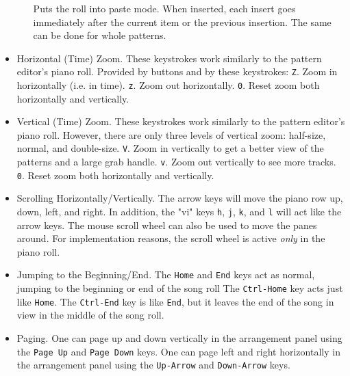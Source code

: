 \begin{itemize}
\begin{itemize}
            Puts the roll into paste mode.
            When inserted, each insert goes immediately
            after the current item or the previous insertion.  The same can be
            done for whole patterns.
         \end{itemize}
      \item Horizontal (Time) Zoom.  These keystrokes work similarly to the
      pattern editor's piano roll.
         Provided by buttons and by these keystrokes:
         \texttt{Z}. Zoom in horizontally (i.e. in time).
         \texttt{z}. Zoom out horizontally.
         \texttt{0}. Reset zoom both horizontally and vertically.
      \item Vertical (Time) Zoom.  These keystrokes work similarly to the
         pattern editor's piano roll.
         However, there are only three levels of
         vertical zoom:  half-size, normal, and double-size.
         \texttt{V}. Zoom in vertically to get a better view of the patterns
            and a large grab handle.
         \texttt{v}. Zoom out vertically to see more tracks.
         \texttt{0}. Reset zoom both horizontally and vertically.
      \item Scrolling Horizontally/Vertically.
         The arrow keys will move the piano row up, down, left, and right.
         In addition, the "vi" keys \texttt{h}, \texttt{j}, \texttt{k}, and
         \texttt{l} will act like the arrow keys.
         The mouse scroll wheel can also be used to move the panes around.
         For implementation reasons, the scroll wheel is active
         \textsl{only} in the piano roll.
      \item Jumping to the Beginning/End.
         The \texttt{Home} and \texttt{End} keys act as normal, jumping to the
         beginning or end of the song roll
         The \texttt{Ctrl-Home} key acts just like \texttt{Home}.
         The \texttt{Ctrl-End} key is like \texttt{End}, but it leaves the
         end of the song in view in the middle of the song roll.
      \item Paging.
         One can page up and down vertically in the arrangement
         panel using the
         \texttt{Page Up} and 
         \texttt{Page Down} keys.
         One can page left and right horizontally in the arrangement
         panel using the
          \texttt{Up-Arrow} and 
          \texttt{Down-Arrow} keys.
   \end{itemize}


